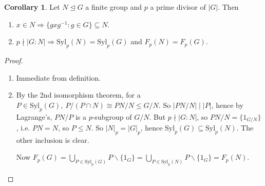 \documentclass[a4paper]{article}
\newcommand{\Syl}{\text{Syl}}
\theoremstyle{definition}
\newtheorem{coro}[defn]{Corollary}
\begin{document}
\begin{coro}
\label{pactionhappeninN}
Let $N\unlhd G$ a finite group and $p$ a prime divisor of $|G|$. Then
\begin{enumerate}
\item $x\in N\Rightarrow \{gxg^{-1}:g\in G\}\subseteq N$.
\item $p\nmid |G:N| \Rightarrow \Syl_p(N)=\Syl_p(G)$ and $F_p(N)=F_p(G)$.
\end{enumerate}
\end{coro}
\begin{proof}
\begin{enumerate}
\item Immediate from definition.
\item By the 2nd isomorphism theorem, for a $P\in\Syl_p(G),\ P/(P\cap N)\cong PN/N\leq G/N$. So $|PN/N|\mid |P|$, hence by Lagrange's, $PN/P$ is a $p$-subgroup of $G/N$. But $p\nmid |G:N|$, so $PN/N=\{1_{G/N}\}$, i.e. $PN=N$, so $P\leq N$. So $|N|_p=|G|_p$, hence $\Syl_p(G)\subseteq \Syl_p(N)$. The other inclusion is clear.

Now $F_p(G)=\bigcup_{P\in\Syl_p(G)} P\backslash \{1_G\}=\bigcup_{P\in\Syl_p(N)} P\backslash \{1_G\}=F_p(N)$.
\end{enumerate}
\end{proof}
\end{document}
